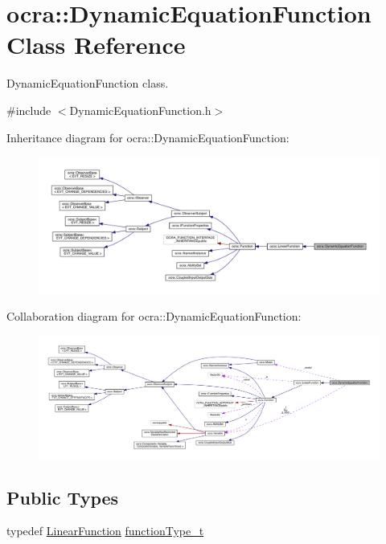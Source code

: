 \hypertarget{classocra_1_1DynamicEquationFunction}{}\section{ocra\+:\+:Dynamic\+Equation\+Function Class Reference}
\label{classocra_1_1DynamicEquationFunction}


Dynamic\+Equation\+Function class.  




{\ttfamily \#include $<$Dynamic\+Equation\+Function.\+h$>$}



Inheritance diagram for ocra\+:\+:Dynamic\+Equation\+Function\+:\nopagebreak
\begin{figure}[H]
\begin{center}
\leavevmode
\includegraphics[width=350pt]{d2/d9b/classocra_1_1DynamicEquationFunction__inherit__graph}
\end{center}
\end{figure}


Collaboration diagram for ocra\+:\+:Dynamic\+Equation\+Function\+:
\nopagebreak
\begin{figure}[H]
\begin{center}
\leavevmode
\includegraphics[width=350pt]{df/dbf/classocra_1_1DynamicEquationFunction__coll__graph}
\end{center}
\end{figure}
\subsection*{Public Types}
\begin{DoxyCompactItemize}
\item 
typedef \hyperlink{classocra_1_1LinearFunction}{Linear\+Function} \hyperlink{classocra_1_1DynamicEquationFunction_a2c8c76bfd66285d63895ec34219175b4}{function\+Type\+\_\+t}
\end{DoxyCompactItemize}
